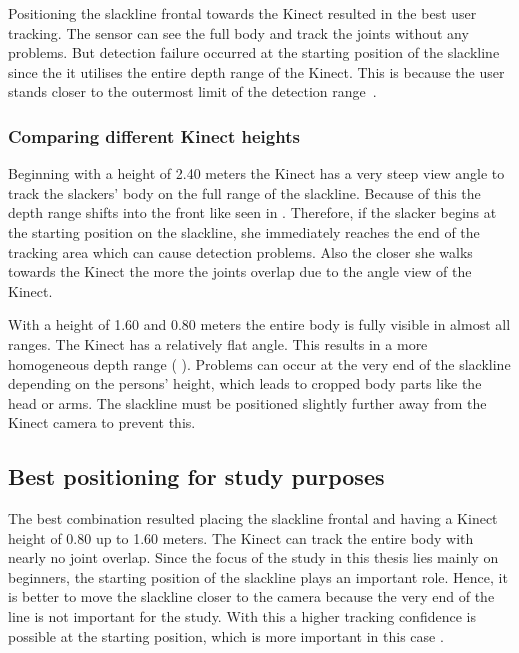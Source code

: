 Positioning the slackline frontal towards the Kinect resulted in the best user tracking.
The sensor can see the full body and track the joints without any problems.
But detection failure occurred at the starting position of the slackline since the it utilises the entire depth range of the Kinect. This is because the user stands closer to the outermost limit of the detection range~\textbf{}.

\subsubsection{Comparing different Kinect heights}

Beginning with a height of 2.40 meters the Kinect has a very steep view angle to track the slackers' body on the full range of the slackline. Because of this the depth range shifts into the front like seen in \textbf{}. Therefore, if the slacker begins at the starting position on the slackline, she immediately reaches the end of the tracking area which can cause detection problems. Also the closer she walks towards the Kinect the more the joints overlap due to the angle view of the Kinect.

With a height of 1.60 and 0.80 meters the entire body is fully visible in almost all ranges. The Kinect has a relatively flat angle. This results in a more homogeneous depth range ( \textbf{}). Problems can occur at the very end of the slackline depending on the persons' height, which leads to cropped body parts like the head or arms. The slackline must be positioned slightly further away from the Kinect camera to prevent this.


\subsection{Best positioning for study purposes}
The best combination resulted placing the slackline frontal and having a Kinect height of 0.80 up to 1.60 meters. The Kinect can track the entire body with nearly no joint overlap. Since the focus of the study in this thesis lies mainly on beginners, the starting position of the slackline plays an important role. Hence, it is better to move the slackline closer to the camera because the very end of the line is not important for the study.
With this a higher tracking confidence is possible at the starting position, which is more important in this case \textbf{}.
